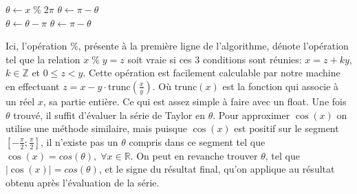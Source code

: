 \documentclass{article}
\begin{document}
\begin{algorithm}
\begin{algorithmic}[1]
\State $\theta \gets x\;\%\;2\pi$
    \State $\theta \gets \pi-\theta$
\EndIf
\\
        \State $\theta \gets \theta-\pi$
        \State $\theta \gets \pi-\theta$
    \EndIf
\EndIf
\end{algorithmic}
\end{algorithm}

Ici, l'opération \%, présente à la première ligne de l'algorithme, dénote l'opération tel que la relation $x\;\%\;y = z$ soit vraie si ces 3 conditions sont réunies: $x = z +ky$, $k \in \mathbb{Z}$ et $0\le z<y$. Cette opération est facilement calculable par notre machine en effectuant $z = x-y\cdot\text{trunc}(\frac{x}{y})$. Où $\text{trunc}(x)$ est la fonction qui associe à un réel $x$, sa partie entière. Ce qui est assez simple à faire avec un float.
Une fois $\theta$ trouvé, il suffit d'évaluer la série de Taylor en $\theta$.
Pour approximer $\cos(x)$ on utilise une méthode similaire, mais puisque $\cos(x)$ est positif sur le segment $[-\frac{\pi}{2}; \frac{\pi}{2}]$, il n'existe pas un $\theta$ compris dans ce segment tel que $\cos(x) = cos(\theta),\;\forall x \in \mathbb{R}.$ On peut en revanche trouver $\theta$, tel que $|\cos(x)| = cos(\theta)$, et le signe du résultat final, qu'on applique au résultat obtenu après l'évaluation de la série.
\end{document}
